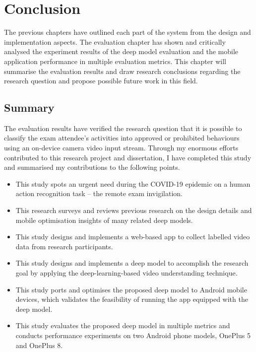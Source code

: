 \makeatletter
\let\savedchap\@makechapterhead
\def\@makechapterhead{\vspace*{-2.5cm}\savedchap}
\chapter{Conclusion}
\let\@makechapterhead\savedchap
\makeatother
\vspace*{-1em}
\label{chap:Conclusion}
The previous chapters have outlined each part of the system from the design and implementation aspects.
The evaluation chapter has shown and critically analysed the experiment results of the deep model evaluation and the mobile application performance in multiple evaluation metrics.
This chapter will summarise the evaluation results and draw research conclusions regarding the research question and propose possible future work in this field.

\section{Summary}
The evaluation results have verified the research question that it is possible to classify the exam attendee's activities into approved or prohibited behaviours using an on-device camera video input stream.
Through my enormous efforts contributed to this research project and dissertation, I have completed this study and summarised my contributions to the following points.

\begin{itemize}[leftmargin=1em]
    \setlength\itemsep{-.5em}
    \item This study spots an urgent need during the COVID-19 epidemic on a human action recognition task -- the remote exam invigilation.
    \item This research surveys and reviews previous research on the design details and mobile optimisation insights of many related deep models.
    \item This study designs and implements a web-based app to collect labelled video data from research participants.
    \item This study designs and implements a deep model to accomplish the research goal by applying the deep-learning-based video understanding technique.
    \item This study ports and optimises the proposed deep model to Android mobile devices, which validates the feasibility of running the app equipped with the deep model.
    \item This study evaluates the proposed deep model in multiple metrics and conducts performance experiments on two Android phone models, OnePlus 5 and OnePlus 8.
\end{itemize}

